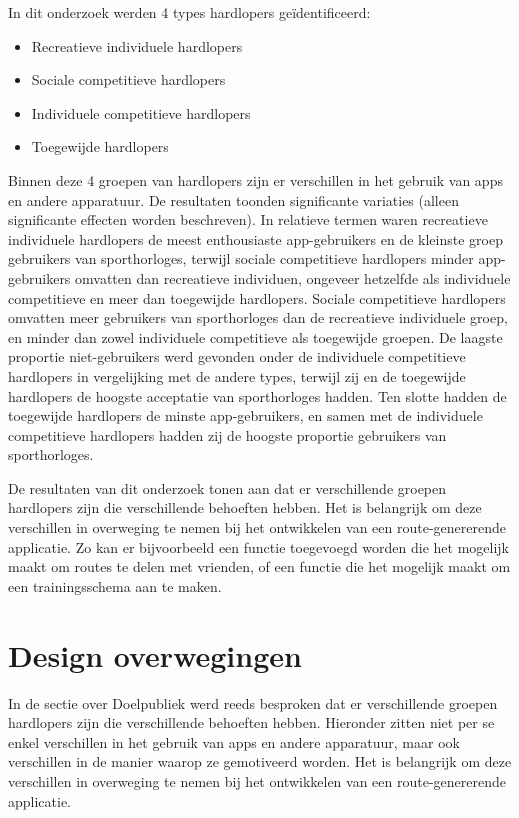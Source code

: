     In dit onderzoek werden 4 types hardlopers geïdentificeerd:
    \begin{itemize}
        \item Recreatieve individuele hardlopers
        \item Sociale competitieve hardlopers
        \item Individuele competitieve hardlopers
        \item Toegewijde hardlopers
    \end{itemize}


    Binnen deze 4 groepen van hardlopers zijn er verschillen in het gebruik van apps en andere apparatuur. 
    De resultaten toonden significante variaties (alleen significante effecten worden beschreven). 
    In relatieve termen waren recreatieve individuele hardlopers de meest enthousiaste app-gebruikers
    en de kleinste groep gebruikers van sporthorloges, terwijl sociale competitieve hardlopers minder app-gebruikers 
    omvatten dan recreatieve individuen, ongeveer hetzelfde als individuele competitieve
    en meer dan toegewijde hardlopers. Sociale competitieve hardlopers omvatten meer gebruikers van sporthorloges 
    dan de recreatieve individuele groep, en minder dan zowel individuele competitieve
    als toegewijde groepen. De laagste proportie niet-gebruikers werd gevonden 
    onder de individuele competitieve hardlopers in vergelijking met de andere types, 
    terwijl zij en de toegewijde hardlopers de hoogste acceptatie van sporthorloges hadden. 
    Ten slotte hadden de toegewijde hardlopers de minste app-gebruikers, 
    en samen met de individuele competitieve hardlopers hadden zij de hoogste proportie gebruikers van sporthorloges.


    De resultaten van dit onderzoek tonen aan dat er verschillende groepen hardlopers zijn die verschillende behoeften hebben. 
    Het is belangrijk om deze verschillen in overweging te nemen bij het ontwikkelen van een route-genererende applicatie.
    Zo kan er bijvoorbeeld een functie toegevoegd worden die het mogelijk maakt om routes te delen met vrienden,
    of een functie die het mogelijk maakt om een trainingsschema aan te maken.

    \section{Design overwegingen}

    In de sectie over Doelpubliek werd reeds besproken dat er verschillende groepen hardlopers zijn die verschillende behoeften hebben.
    Hieronder zitten niet per se enkel verschillen in het gebruik van apps en andere apparatuur, maar ook verschillen in de manier waarop ze gemotiveerd worden.
    Het is belangrijk om deze verschillen in overweging te nemen bij het ontwikkelen van een route-genererende applicatie.


